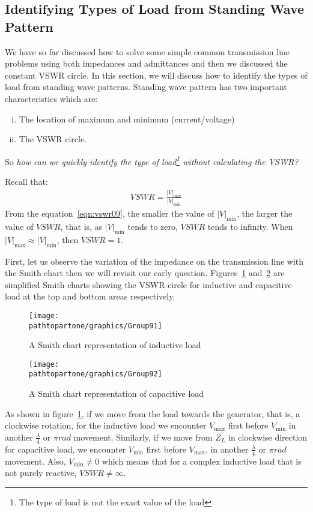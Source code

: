 \subsection{Identifying Types of Load from Standing Wave Pattern}\label{lec:lec9}

We have so far discussed how to solve some simple common transmission line problems using both impedances and admittances and then we discussed the constant VSWR circle. In this section, we will discuss how to identify the types of load from standing wave patterns. Standing wave pattern has two important characteristics which are:
\begin{enumerate}[(i)]
\item The location of maximum and minimum (current/voltage)
\item The VSWR circle.
\end{enumerate}
So \emph{how can we quickly identify the type of load\footnote{The type of load is not the exact value of the load} without calculating the VSWR?}

Recall that:
\begin{align}
VSWR = \frac{|V|_\max}{|V|_\min}
\label{eqn:vswr09}
\end{align}
From the equation~\eqref{eqn:vswr09}, the smaller the value of $|V|_\min$, the larger the value of ${VSWR}$, that is, as $|V|_\min$ tends to zero, ${VSWR}$ tends to infinity. When $|V|_\max{\approx}|V|_\min$, then $VSWR = 1$.

First, let us observe the variation of the impedance on the transmission line with the Smith chart then we will revisit our early question. Figures~\ref{fig:group91} and~\ref{fig:group92} are simplified Smith charts showing the VSWR circle for inductive and capacitive load at the top and bottom areas respectively.
\begin{figure}[h]
\centering
\texttt{[image: \\pathtopartone/graphics/Group91]}
\caption{A Smith chart representation of inductive load}
\label{fig:group91}
\end{figure}
\begin{figure}[h]
\centering
\texttt{[image: \\pathtopartone/graphics/Group92]}
\caption{A Smith chart representation of capacitive load}
\label{fig:group92}
\end{figure}

As shown in figure~\ref{fig:group91}, if we move from the load towards the generator, that is, a clockwise rotation, for the inductive load we encounter $V_\max$ first before ${V_\min}$ in another $\frac{\lambda}{4}$ or $\pi rad$ movement. Similarly, if we move from $\bar{Z_L}$ in clockwise direction for capacitive load, we encounter $V_\min$ first before $V_\max$, in another $\frac{\lambda}{4}$ or $\pi rad$ movement. Also, $V_\min\neq0$ which means that for a complex inductive load that is not purely reactive, $VSWR\neq\infty$.

